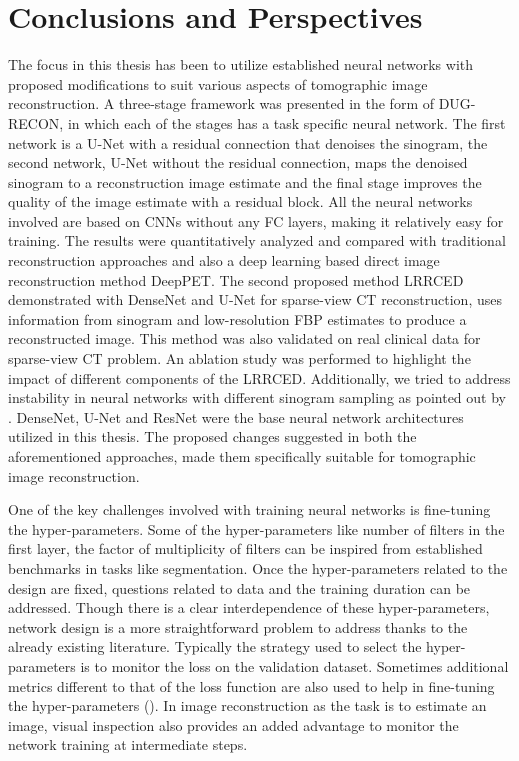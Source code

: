 
\chapter{Conclusions and Perspectives} %

\label{Chapter6} %

The focus in this thesis has been to utilize established neural networks with proposed modifications to suit various aspects of tomographic image reconstruction. A three-stage framework was presented in the form of DUG-RECON, in which each of the stages has a task specific neural network. The first network is a U-Net with a residual connection that denoises the sinogram, the second network, U-Net without the residual connection, maps the denoised sinogram to a reconstruction image estimate and the final stage improves the quality of the image estimate with a residual block. All the neural networks involved are based on \acp{CNN} without any \ac{FC} layers, making it relatively easy for training. The results were quantitatively analyzed and compared with traditional reconstruction approaches and also a deep learning based direct image reconstruction method DeepPET. The second proposed method \ac{LRRCED} demonstrated with DenseNet and U-Net for sparse-view CT reconstruction, uses information from sinogram and low-resolution \ac{FBP} estimates to produce a reconstructed image. This method was also validated on real clinical data for sparse-view CT problem. An ablation study was performed to highlight the impact of different components of the LRRCED. Additionally, we tried to address instability in neural networks with different sinogram sampling as pointed out by \cite{antun2020instabilities}. DenseNet, U-Net and ResNet were the base neural network architectures utilized in this thesis. The proposed changes suggested in both the aforementioned approaches, made them specifically suitable for tomographic image reconstruction. 

One of the key challenges involved with training neural networks is fine-tuning the hyper-parameters. Some of the hyper-parameters like number of filters in the first layer, the factor of multiplicity of filters can be inspired from established benchmarks in tasks like segmentation. Once the hyper-parameters related to the design are fixed, questions related to data and the training duration can be addressed. Though there is a clear interdependence of these hyper-parameters, network design is a more straightforward problem to address thanks to the already existing literature. Typically the strategy used to select the hyper-parameters is to monitor the loss on the validation dataset. Sometimes additional metrics different to that of the loss function are also used to help in fine-tuning the hyper-parameters (\cite{zhang2018sparse}). In image reconstruction as the task is to estimate an image, visual inspection also provides an added advantage to monitor the network training at intermediate steps. 

